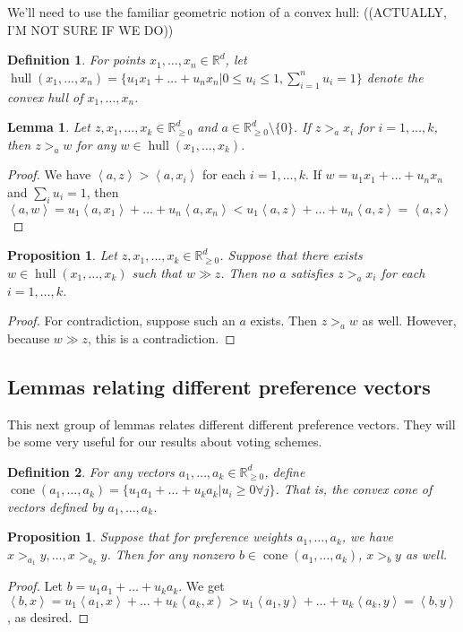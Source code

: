 \documentclass[12pt]{article}
\newtheorem*{definition}{Definition}
\newtheorem{proposition}[theorem]{Proposition}
\newtheorem{lemma}[theorem]{Lemma}
\newcommand{\R}{\mathbb{R}}
\newcommand{\Rgz}{\mathbb{R}_{\ge 0}}
\newcommand{\ip}[2]{\left\langle{#1},{#2}\right\rangle}
\DeclareMathOperator*{\cone}{cone}
\DeclareMathOperator*{\hull}{hull}
\newcommand{\1}[1]{\mathds{1}[{#1}]}
\begin{document}
    We'll need to use the familiar geometric notion of a convex hull:
    ((ACTUALLY, I'M NOT SURE IF WE DO))
    \begin{definition}
      For points $x_1,\ldots,x_n \in \R^d$, let $\hull(x_1,\ldots,x_n)
      = \{u_1x_1 + \ldots + u_nx_n | 0\le u_i\le 1, \sum_{i=1}^n u_i = 1\}$
      denote the convex hull of $x_1,\ldots,x_n$.
    \end{definition}
    \begin{lemma}
      Let $z,x_1,\ldots,x_k \in \Rgz^d$ and $a\in \Rgz^d \setminus \{0\}$.
      If $z >_a x_i$ for $i=1,\ldots,k$, then $z >_a w$
      for any $w\in \hull(x_1,\ldots,x_k)$.
    \end{lemma}
    \begin{proof}
      We have $\ip{a}{z} > \ip{a}{x_i}$ for each $i=1,\ldots,k$.
      If $w = u_1x_1+ \ldots + u_nx_n$ and $\sum_i u_i =1$, then
      $\ip{a}{w} = u_1\ip{a}{x_1}+\ldots+u_n\ip{a}{x_n}
      < u_1\ip{a}{z} + \ldots + u_n\ip{a}{z} = \ip{a}{z}$
    \end{proof}
    \begin{proposition}\label{prop:noFavoriteHull}
      Let $z,x_1,\ldots,x_k \in \Rgz^d$.
      Suppose that there exists $w\in \hull(x_1,\ldots,x_k)$
      such that $w \gg z$.
      Then no $a$ satisfies $z >_a x_i$ for each $i=1,\ldots, k$.
    \end{proposition}
    \begin{proof}
      For contradiction, suppose such an $a$ exists.
      Then $z >_a w$ as well. However, because $w \gg z$,
      this is a contradiction.
    \end{proof}

  \subsection{Lemmas relating different preference vectors}
    This next group of lemmas relates different different preference vectors.
    They will be some very useful for our results about voting schemes.

    \begin{definition}
      For any vectors $a_1,\ldots, a_k \in \Rgz^d$, define
      $\cone(a_1,\ldots,a_k) = \{ u_1a_1 + \ldots + u_ka_k | u_i\ge 0 \forall j\}$.
      That is, the convex cone of vectors defined by $a_1,\ldots,a_k$.
    \end{definition}
    \begin{proposition}
      Suppose that for preference weights $a_1,\ldots, a_k$,
      we have $x >_{a_1} y, \ldots, x >_{a_k} y$.
      Then for any nonzero $b\in \cone(a_1,\ldots, a_k)$,
      $x >_b y$ as well.
    \end{proposition}
    \begin{proof}
      Let $b = u_1a_1+ \ldots + u_ka_k$.
      We get $\ip{b}{x} = u_1\ip{a_1}{x} + \ldots + u_k\ip{a_k}{x}
      > u_1\ip{a_1}{y} + \ldots + u_k\ip{a_k}{y} = \ip{b}{y}$,
      as desired.
    \end{proof}
\end{document}
